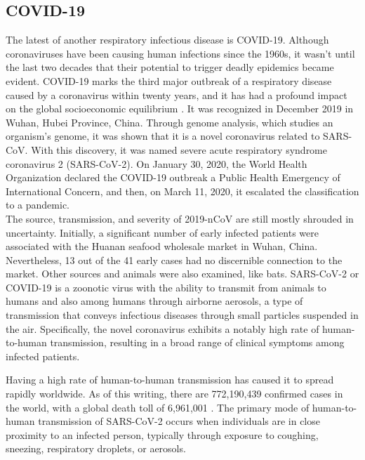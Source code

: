 \subsection{COVID-19}
The latest of another respiratory infectious disease is COVID-19. Although coronaviruses have been causing human infections since the 1960s, it wasn't until the last two decades that their potential to trigger deadly epidemics became evident. COVID-19 marks the third major outbreak of a respiratory disease caused by a coronavirus within twenty years, and it has had a profound impact on the global socioeconomic equilibrium . It was recognized in December 2019 in Wuhan, Hubei Province, China\cite{a2020_what}. Through genome analysis, which studies an organism's genome, it was shown that it is a novel coronavirus related to SARS-CoV. With this discovery, it was named severe acute respiratory syndrome coronavirus 2 (SARS-CoV-2). On January 30, 2020, the World Health Organization declared the COVID-19 outbreak a Public Health Emergency of International Concern, and then, on March 11, 2020, it escalated the classification to a pandemic. \cite{worldhealthorganization_2020_covid19}\\

The source, transmission, and severity of 2019-nCoV are still mostly shrouded in uncertainty. Initially, a significant number of early infected patients were associated with the Huanan seafood wholesale market in Wuhan, China. Nevertheless, 13 out of the 41 early cases had no discernible connection to the market. Other sources and animals were also examined, like bats\cite{king_2011_virus}. SARS-CoV-2 or COVID-19 is a zoonotic virus with the ability to transmit from animals to humans and also among humans through airborne aerosols, a type of transmission that conveys infectious diseases through small particles suspended in the air. Specifically, the novel coronavirus exhibits a notably high rate of human-to-human \cite{agentbased} transmission, resulting in a broad range of clinical symptoms among infected patients.\\ \cite{explanation}

Having a high rate of human-to-human transmission has caused it to spread rapidly worldwide. As of this writing, there are 772,190,439 confirmed cases in the world, with a global death toll of 6,961,001 . The primary mode of human-to-human transmission of SARS-CoV-2 occurs when individuals are in close proximity to an infected person, typically through exposure to coughing, sneezing, respiratory droplets, or aerosols.


